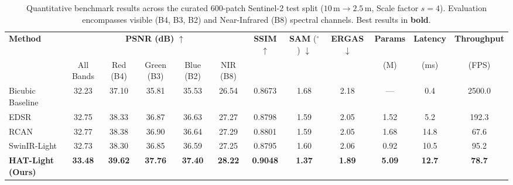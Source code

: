 \begin{table}[t]
\centering
\caption{Quantitative benchmark results across the curated 600-patch Sentinel-2 test split ($10\,\text{m} \to 2.5\,\text{m}$, Scale factor $s=4$). Evaluation encompasses visible (B4, B3, B2) and Near-Infrared (B8) spectral channels. Best results in \textbf{bold}.}
\label{tab:comparative_results}
\footnotesize
\renewcommand{\arraystretch}{1.22}
\setlength{\tabcolsep}{0pt}
\begin{tabular*}{\textwidth}{@{\extracolsep{\fill}} l ccccc ccc c cc}
\toprule
\textbf{Method} & \multicolumn{5}{c}{\textbf{PSNR (dB)} $\uparrow$} & \textbf{SSIM} $\uparrow$ & \textbf{SAM} ($^\circ$) $\downarrow$ & \textbf{ERGAS} $\downarrow$ & \textbf{Params} & \textbf{Latency} & \textbf{Throughput} \\
\cmidrule(lr){2-6}
& All Bands & Red (B4) & Green (B3) & Blue (B2) & NIR (B8) & & & & (M) & (ms) & (FPS) \\
\midrule
Bicubic Baseline & 32.23 & 37.10 & 35.81 & 35.53 & 26.54 & 0.8673 & 1.68 & 2.18 & --- & 0.4 & 2500.0 \\
EDSR \cite{lim2017enhanced} & 32.75 & 38.33 & 36.87 & 36.63 & 27.27 & 0.8798 & 1.59 & 2.05 & 1.52 & 5.2 & 192.3 \\
RCAN \cite{zhang2018rcan} & 32.77 & 38.38 & 36.90 & 36.64 & 27.29 & 0.8801 & 1.59 & 2.05 & 1.68 & 14.8 & 67.6 \\
SwinIR-Light \cite{liang2021swinir} & 32.73 & 38.30 & 36.85 & 36.59 & 27.25 & 0.8795 & 1.60 & 2.06 & 0.92 & 10.5 & 95.2 \\
\textbf{HAT-Light (Ours)} & \textbf{33.48} & \textbf{39.62} & \textbf{37.76} & \textbf{37.40} & \textbf{28.22} & \textbf{0.9048} & \textbf{1.37} & \textbf{1.89} & \textbf{5.09} & \textbf{12.7} & \textbf{78.7} \\
\bottomrule
\end{tabular*}
\end{table}
